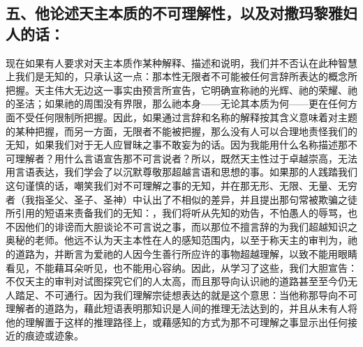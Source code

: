 
\subsection{五、他论述天主本质的不可理解性，以及对撒玛黎雅妇人的话：}

现在如果有人要求对天主本质作某种解释、描述和说明，我们并不否认在此种智慧上我们是无知的，只承认这一点：那本性无限者不可能被任何言辞所表达的概念所把握。天主伟大无边这一事实由预言所宣告，它明确宣称祂的光辉、祂的荣耀、祂的圣洁；如果祂的周围没有界限，那么祂本身——无论其本质为何——更在任何方面不受任何限制所把握。因此，如果通过言辞和名称的解释按其含义意味着对主题的某种把握，而另一方面，无限者不能被把握，那么没有人可以合理地责怪我们的无知，如果我们对于无人应冒昧之事不敢妄为的话。因为我能用什么名称描述那不可理解者？用什么言语宣告那不可言说者？所以，既然天主性过于卓越崇高，无法用言语表达，我们学会了以沉默尊敬那超越言语和思想的事。如果那的人践踏我们这句谨慎的话，嘲笑我们对不可理解之事的无知，并在那无形、无限、无量、无穷者（我指圣父、圣子、圣神）中认出了不相似的差异，并且提出那句常被欺骗之徒所引用的短语来责备我们的无知：，我们将听从先知的劝告，不怕愚人的辱骂，也不因他们的诽谤而大胆谈论不可言说之事，而以那位不擅言辞的为我们超越知识之奥秘的老师。他远不认为天主本性在人的感知范围内，以至于称天主的审判为，祂的道路为，并断言为爱祂的人因今生善行所应许的事物超越理解，以致不能用眼睛看见，不能藉耳朵听见，也不能用心容纳。因此，从学习了这些，我们大胆宣告：不仅天主的审判对试图探究它们的人太高，而且那导向认识祂的道路甚至至今仍无人踏足、不可通行。因为我们理解宗徒想表达的就是这个意思：当他称那导向不可理解者的道路为，藉此短语表明那知识是人间的推理无法达到的，并且从未有人将他的理解置于这样的推理路径上，或藉感知的方式为那不可理解之事显示出任何接近的痕迹或迹象。\par


